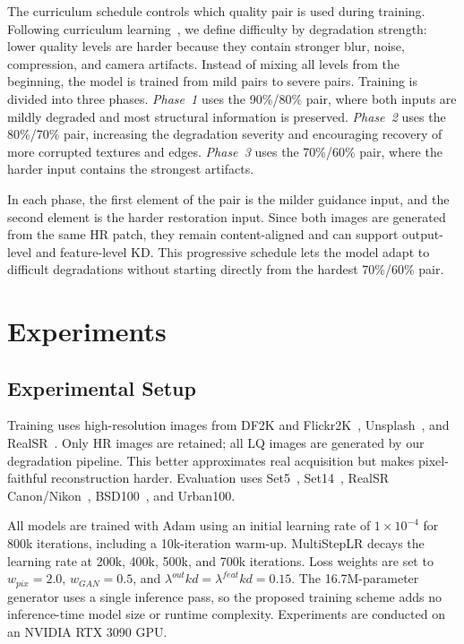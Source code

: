 \documentclass[runningheads]{llncs}
\begin{document}
The curriculum schedule controls which quality pair is used during training. Following curriculum learning~\cite{Bengio09}, we define difficulty by degradation strength: lower quality levels are harder because they contain stronger blur, noise, compression, and camera artifacts. Instead of mixing all levels from the beginning, the model is trained from mild pairs to severe pairs. Training is divided into three phases. \emph{Phase~1} uses the 90\%/80\% pair, where both inputs are mildly degraded and most structural information is preserved. \emph{Phase~2} uses the 80\%/70\% pair, increasing the degradation severity and encouraging recovery of more corrupted textures and edges. \emph{Phase~3} uses the 70\%/60\% pair, where the harder input contains the strongest artifacts.

In each phase, the first element of the pair is the milder guidance input, and the second element is the harder restoration input. Since both images are generated from the same HR patch, they remain content-aligned and can support output-level and feature-level KD. This progressive schedule lets the model adapt to difficult degradations without starting directly from the hardest 70\%/60\% pair.


\section{Experiments}
\subsection{Experimental Setup}

Training uses high-resolution images from DF2K and Flickr2K~\cite{Timofte2017NTIRE2C}, Unsplash~\cite{unsplash_dataset}, and RealSR~\cite{realsr}. Only HR images are retained; all LQ images are generated by our degradation pipeline. 
This better approximates real acquisition but makes pixel-faithful reconstruction harder. Evaluation uses Set5~\cite{set5}, Set14~\cite{set14}, RealSR Canon/Nikon~\cite{realsr}, BSD100~\cite{bsd100}, and Urban100\cite{urban100}.


All models are trained with Adam using an initial learning rate of $1\times10^{-4}$ for 800k iterations, including a 10k-iteration warm-up. MultiStepLR decays the learning rate at 200k, 400k, 500k, and 700k iterations. Loss weights are set to $w_{pix}=2.0$, $w_{GAN}=0.5$, and $\lambda^{out}{kd}=\lambda^{feat}{kd}=0.15$. The 16.7M-parameter generator uses a single inference pass, so the proposed training scheme adds no inference-time model size or runtime complexity. Experiments are conducted on an NVIDIA RTX 3090 GPU. 
\end{document}
